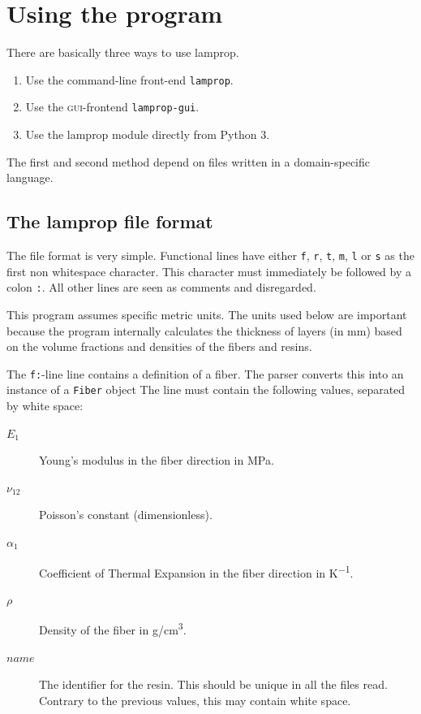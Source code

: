 \documentclass[a4paper,landscape,oneside,11pt,twocolumn]{memoir}
\begin{document}
\chapter{Using the program} %

There are basically three ways to use lamprop.

\begin{enumerate}
    \item Use the command-line front-end \texttt{lamprop}.
    \item Use the \textsc{gui}-frontend \texttt{lamprop-gui}.
    \item Use the lamprop module directly from Python 3.
\end{enumerate}

The first and second method depend on files written in a domain-specific
language.

\section{The lamprop file format} %

The file format is very simple. Functional lines have either \texttt{f},
\texttt{r}, \texttt{t}, \texttt{m}, \texttt{l} or \texttt{s} as the first
non whitespace character. This character must immediately be followed by
a colon \texttt{:}. All other lines are seen as comments and disregarded.

This program assumes specific metric units. The units used below are important
because the program internally calculates the thickness of layers (in mm)
based on the volume fractions and densities of the fibers and resins.

The \texttt{f:}-line line contains a definition of a fiber. The parser
converts this into an instance of a \texttt{Fiber} object The line must
contain the following values, separated by white space:
\begin{description}
    \item[$E_1$] Young's modulus in the fiber direction in \si{MPa}.
    \item[$\nu_{12}$] Poisson's constant (dimensionless).
    \item[$\alpha_1$] Coefficient of Thermal Expansion in the fiber direction
        in \si{K^{-1}}.
    \item[$\rho$] Density of the fiber in \si{g/cm^3}.
    \item[$name$] The identifier for the resin. This should be unique in all
        the files read. Contrary to the previous values, this may contain
        white space.
\end{description}
\end{document}

